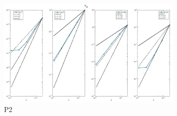 \documentclass[8pt]{beamer}
\begin{document}
\begin{frame}
\begin{columns}
\begin{column}{0.5\textwidth}
\begin{figure}[h]
    \end{figure}
    \vspace{-4mm}
    \begin{figure}[h]
	\includegraphics[width=0.8\textwidth]{P2_Vm_1.jpg} \caption{P2}
	\end{figure}
    \end{column}
\end{columns}
\end{frame}
\end{document}
